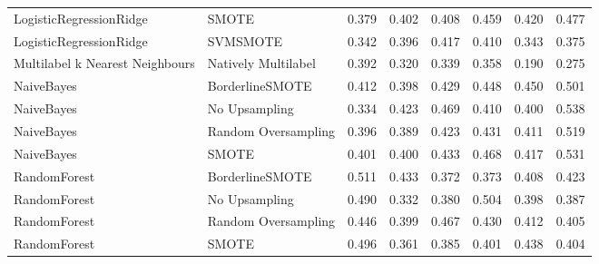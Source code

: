 \begin{tabular}{llllllll}
        LogisticRegressionRidge &                         SMOTE & 0.379 &                     0.402 &                 0.408 &                  0.459 &                                   0.420 &    0.477 \\
        LogisticRegressionRidge &                      SVMSMOTE & 0.342 &                     0.396 &                 0.417 &                  0.410 &                                   0.343 &    0.375 \\
Multilabel k Nearest Neighbours &           Natively Multilabel & 0.392 &                     0.320 &                 0.339 &                  0.358 &                                   0.190 &    0.275 \\
                     NaiveBayes &               BorderlineSMOTE & 0.412 &                     0.398 &                 0.429 &                  0.448 &                                   0.450 &    0.501 \\
                     NaiveBayes &                 No Upsampling & 0.334 &                     0.423 &                 0.469 &                  0.410 &                                   0.400 &    0.538 \\
                     NaiveBayes &           Random Oversampling & 0.396 &                     0.389 &                 0.423 &                  0.431 &                                   0.411 &    0.519 \\
                     NaiveBayes &                         SMOTE & 0.401 &                     0.400 &                 0.433 &                  0.468 &                                   0.417 &    0.531 \\
                   RandomForest &               BorderlineSMOTE & 0.511 &                     0.433 &                 0.372 &                  0.373 &                                   0.408 &    0.423 \\
                   RandomForest &                 No Upsampling & 0.490 &                     0.332 &                 0.380 &                  0.504 &                                   0.398 &    0.387 \\
                   RandomForest &           Random Oversampling & 0.446 &                     0.399 &                 0.467 &                  0.430 &                                   0.412 &    0.405 \\
                   RandomForest &                         SMOTE & 0.496 &                     0.361 &                 0.385 &                  0.401 &                                   0.438 &    0.404 \\

\end{tabular}

